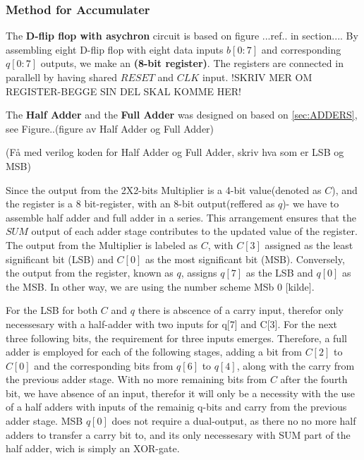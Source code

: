 \subsubsection{Method for Accumulater}
 
The \textbf{D-flip flop with asychron} circuit is based on figure ...ref.. in section.... By assembling eight D-flip flop with eight data inputs $b[0:7]$ and corresponding $q[0:7]$ outputs, we make an \textbf{(8-bit register)}. The registers are connected in parallell by having shared $RESET$ and $CLK$ input. 
!SKRIV MER OM REGISTER-BEGGE SIN DEL SKAL KOMME HER!



The \textbf{Half Adder} and the \textbf{Full Adder} was designed on based on \ref{sec:ADDERS}, see Figure..(figure av Half Adder og Full Adder)

(Få med verilog koden for Half Adder og Full Adder, skriv hva som er LSB og MSB)



Since the output from the 2X2-bits Multiplier is a 4-bit value(denoted as $C$), and the register is a 8 bit-register, with an 8-bit output(reffered as $q$)- we have to assemble half adder and full adder in a series. This arrangement ensures that the $SUM$ output of each adder stage contributes to the updated value of the register. The output from the Multiplier is labeled as $C$, with $C[3]$ assigned as the least significant bit (LSB) and $C[0]$ as the most significant bit (MSB). Conversely, the output from the register, known as $q$, assigns $q[7]$ as the LSB and $q[0]$ as the MSB. In other way, we are using the number scheme MSb 0 [kilde].

For the LSB for both $C$ and $q$ there is abscence of a carry input, therefor only necessesary with a half-adder with two inputs for q[7] and C[3]. For the next three following bits, the requirement for three inputs emerges. Therefore, a full adder is employed for each of the following stages, adding a bit from $C[2]$ to $C[0]$ and the corresponding bits from $q[6]$ to $q[4]$, along with the carry from the previous adder stage. With no more remaining bits from $C$ after the fourth bit, we have absence of an input, therefor it will only be a necessity with the use of a half adders with inputs of the remainig q-bits and carry from the previous adder stage. MSB $q[0]$ does not require a dual-output, as there no no more half adders to transfer a carry bit to, and its only necessesary with SUM part of the half adder, wich is simply an XOR-gate.

 





